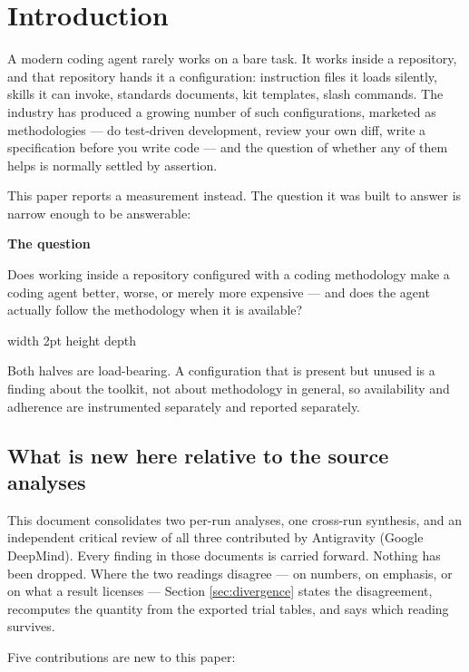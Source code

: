 \documentclass[11pt,a4paper]{article}
\newenvironment{finding}[1]
  {\par\medskip\noindent\begin{lrbox}{\findingbox}%
   \begin{minipage}{\dimexpr\linewidth-2\fboxsep-4pt}%
   \vspace{3pt}\textbf{\color{accent}#1}\par\smallskip\small}
  {\vspace{4pt}\end{minipage}\end{lrbox}%
   \noindent\textcolor{accent}{\vrule width 2pt height \dimexpr\ht\findingbox\relax depth \dimexpr\dp\findingbox\relax}%
   \colorbox{shade}{\usebox{\findingbox}}\par\medskip}
\begin{document}
\tableofcontents
\clearpage

\section{Introduction}
\label{sec:intro}

A modern coding agent rarely works on a bare task. It works inside a repository, and that
repository hands it a configuration: instruction files it loads silently, skills it can
invoke, standards documents, kit templates, slash commands. The industry has produced a
growing number of such configurations, marketed as methodologies --- do test-driven
development, review your own diff, write a specification before you write code --- and the
question of whether any of them helps is normally settled by assertion.

This paper reports a measurement instead. The question it was built to answer is narrow
enough to be answerable:

\begin{finding}{The question}
Does working inside a repository configured with a coding methodology make a coding agent
better, worse, or merely more expensive --- and does the agent actually follow the
methodology when it is available?
\end{finding}

\noindent Both halves are load-bearing. A configuration that is present but unused is a
finding about the toolkit, not about methodology in general, so availability and adherence
are instrumented separately and reported separately.

\subsection{What is new here relative to the source analyses}

This document consolidates two per-run analyses, one cross-run synthesis, and an independent
critical review of all three contributed by Antigravity (Google DeepMind). Every finding in
those documents is carried forward. Nothing has been dropped. Where the two readings
disagree --- on numbers, on emphasis, or on what a result licenses --- Section
\ref{sec:divergence} states the disagreement, recomputes the quantity from the exported
trial tables, and says which reading survives.

Five contributions are new to this paper:
\end{document}
